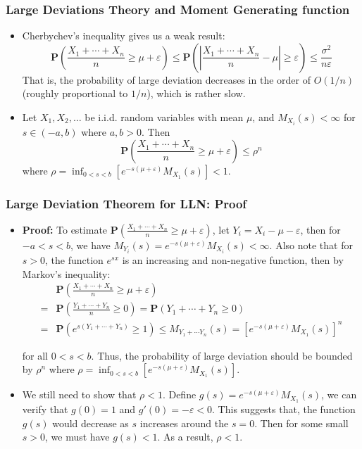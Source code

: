 \documentclass[handout]{beamer}
\newcommand{\BP}{\mathbf{P}}
\begin{document}
\frame
{
  \frametitle{Large Deviations Theory and Moment Generating function} 

   \begin{itemize}

                 \item<1-> Cherbychev's inequality gives us a weak result:
                                  $$\BP\left(\frac{X_1+\cdots+X_n}{n}\geq \mu+\varepsilon\right)\leq \BP\left(\left|\frac{X_1+\cdots+X_n}{n}-\mu\right|\geq \varepsilon \right)\leq \frac{\sigma^2}{ n \varepsilon}$$
                            That is, the probability of large deviation decreases in the order of $O(1/n)$ (roughly proportional to $1/n$), which is rather slow. 

               \item<2->[] \begin{Theorem} Let $X_1, X_2,\ldots$ be i.i.d. random variables with mean $\mu$, and $M_{X_i}(s) <\infty $ for $s\in (-a, b)$ where $a, b>0$. Then 
               $$\BP \left( \frac{X_1+\cdots+X_n}{n}\geq \mu+\varepsilon \right) \leq \rho^n$$
               where $\rho=\inf_{0<s<b} [e^{-s(\mu+\varepsilon)} M_{X_1} (s) ]<1.$
                            \end{Theorem}
          
          
                            \end{itemize}
}

\frame
{
  \frametitle{Large Deviation Theorem for LLN: Proof} 

   \begin{itemize}

                 \item<1-> \textbf{Proof:} To estimate $\BP(\frac{X_1+\cdots+X_n}{n}\geq \mu+\varepsilon)$, let $Y_i=X_i-\mu-\varepsilon$, then for $-a<s<b$, we have $M_{Y_i}(s)=e^{-s(\mu+\varepsilon)} M_{X_i} (s) <\infty$. Also note that for $s>0$, the function $e^{sx}$ is an increasing and non-negative function, then by Markov's inequality: 
                          \begin{align*} &  \BP(\frac{X_1+\cdots+X_n}{n}\geq \mu+\varepsilon) \\ =  & \BP(\frac{Y_1+\cdots+Y_n}{n}\geq 0) = \BP(Y_1+\cdots+Y_n\geq 0) \\ = &   \BP(e^{s(Y_1+\cdots+Y_n)}\geq 1) \leq M_{Y_1+\cdots Y_n} (s)= [ e^{-s(\mu+\varepsilon)} M_{X_1} (s) ]^n \end{align*}
      
              for all $0<s<b$. Thus, the probability of large deviation should be bounded by $\rho^n$ where $\rho=\inf_{0<s<b} [e^{-s(\mu+\varepsilon)} M_{X_1} (s) ]$. 
              
 
                 \item<2->[-] We still need to show that $\rho<1$. Define $g(s)=e^{-s(\mu+\varepsilon)} M_{X_1} (s) $, we can verify that $g(0)=1$ and $g'(0)=-\varepsilon<0$.  This suggests that, the function $g(s)$ would decrease as $s$ increases around the $s=0$. Then for some small $s>0$, we must have $g(s)<1$. As a result,  $\rho<1$.
                           
          
                            \end{itemize}
}
\end{document}
